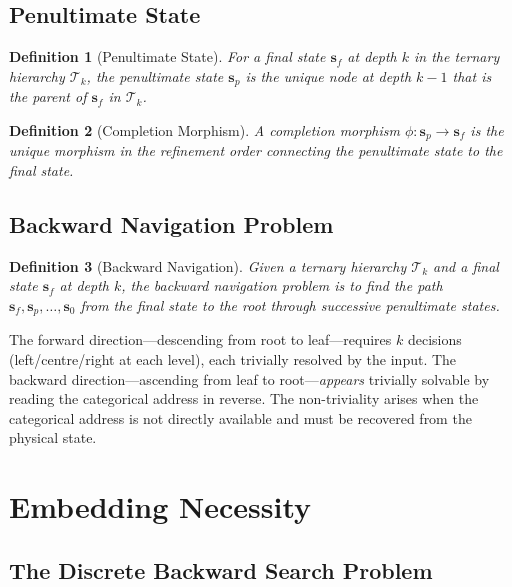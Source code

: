 \documentclass[12pt,twocolumn]{article}
\newtheorem{definition}{Definition}[section]
\begin{document}
\subsection{Penultimate State}

\begin{definition}[Penultimate State]
\label{def:penultimate}
For a final state $\mathbf{s}_f$ at depth $k$ in the ternary hierarchy $\mathcal{T}_k$, the \emph{penultimate state} $\mathbf{s}_p$ is the unique node at depth $k-1$ that is the parent of $\mathbf{s}_f$ in $\mathcal{T}_k$.
\end{definition}

\begin{definition}[Completion Morphism]
\label{def:completion}
A \emph{completion morphism} $\phi: \mathbf{s}_p \to \mathbf{s}_f$ is the unique morphism in the refinement order connecting the penultimate state to the final state.
\end{definition}

\subsection{Backward Navigation Problem}

\begin{definition}[Backward Navigation]
\label{def:backward_nav}
Given a ternary hierarchy $\mathcal{T}_k$ and a final state $\mathbf{s}_f$ at depth $k$, the \emph{backward navigation problem} is to find the path $\mathbf{s}_f, \mathbf{s}_p, \ldots, \mathbf{s}_0$ from the final state to the root through successive penultimate states.
\end{definition}

The forward direction---descending from root to leaf---requires $k$ decisions (left/centre/right at each level), each trivially resolved by the input. The backward direction---ascending from leaf to root---\emph{appears} trivially solvable by reading the categorical address in reverse. The non-triviality arises when the categorical address is not directly available and must be recovered from the physical state.


\section{Embedding Necessity}
\label{sec:necessity}

\subsection{The Discrete Backward Search Problem}
\end{document}
